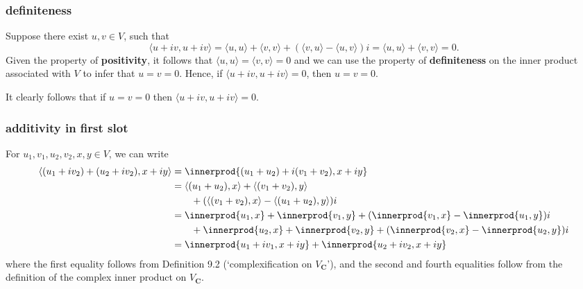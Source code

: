\documentclass{article}
\DeclarePairedDelimiter{\innerprod}\langle\rangle
\begin{document}
\subsubsection*{definiteness}
Suppose there exist $u,v\in V$, such that
\[\langle u+iv,u+iv\rangle=\langle u,u\rangle +\langle v,v\rangle + (\langle v,u\rangle - \langle u,v\rangle)i=\langle u,u\rangle +\langle v,v\rangle=0.\]
Given the property of \textbf{positivity}, it follows that $\langle u,u\rangle=\langle v,v\rangle=0$ and we can use the property of \textbf{definiteness} on the inner product associated with $V$ to infer that $u=v=0$. 
Hence, if $\langle u+iv,u+iv\rangle=0$, then $u=v=0$.

It clearly follows that if $u=v=0$ then $\langle u+iv,u+iv\rangle=0$.

\subsubsection*{additivity in first slot}
For $u_1,v_1,u_2,v_2,x,y\in V$, we can write
\begin{align*}
    \langle (u_1+iv_2)+(u_2+iv_2),x+iy\rangle&=\innerprod{(u_1+u_2)+i(v_1+v_2),x+iy}\\
    &=\langle (u_1+u_2),x\rangle +\langle (v_1+v_2),y\rangle\\
    &\qquad+ (\langle (v_1+v_2),x\rangle - \langle (u_1+u_2),y\rangle)i\\
    &=\innerprod{u_1,x}+\innerprod{v_1,y}+(\innerprod{v_1,x}-\innerprod{u_1,y})i\\
    &\qquad +\innerprod{u_2,x}+\innerprod{v_2,y}+(\innerprod{v_2,x}-\innerprod{u_2,y})i\\
    &=\innerprod{u_1+iv_1,x+iy}+\innerprod{u_2+iv_2,x+iy}
\end{align*}
where the first equality follows from Definition 9.2 (`complexification on $V_{\textbf{C}}$'), and the second and fourth equalities follow from the definition of the complex inner product on $V_{\textbf{C}}$.
\end{document}
